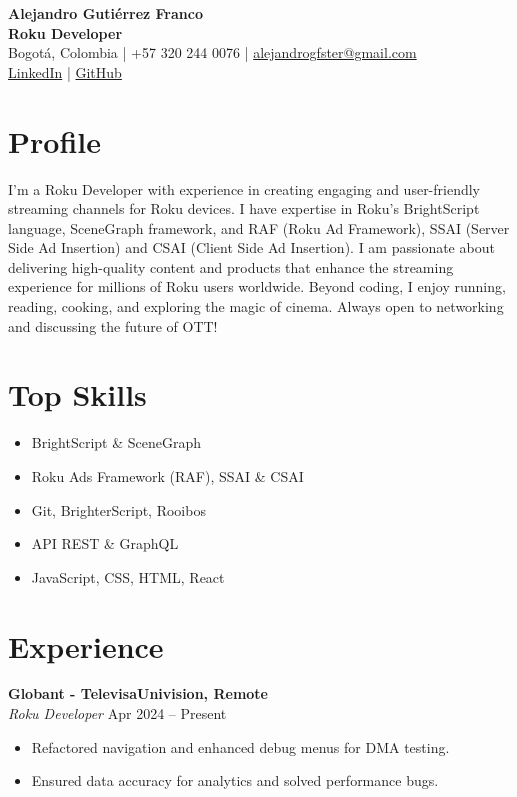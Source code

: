 \documentclass[11pt,a4paper]{article}
\begin{document}
\raggedright
\sloppy

\begin{center}
    {\LARGE \textbf{Alejandro Gutiérrez Franco}}\\
    \textbf{Roku Developer} \\
    Bogotá, Colombia | +57 320 244 0076 | \href{mailto:alejandrogfster@gmail.com}{alejandrogfster@gmail.com} \\
    \href{https://www.linkedin.com/in/alejandro-gutierrez-franco-06214674}{LinkedIn} |
    \href{https://github.com/fragualej/creative-coding}{GitHub}
\end{center}

\section*{Profile}
I'm a Roku Developer with experience in creating engaging and user-friendly streaming channels for Roku devices. I have expertise in Roku's BrightScript language, SceneGraph framework, and RAF (Roku Ad Framework), SSAI (Server Side Ad Insertion) and CSAI (Client Side Ad Insertion). I am passionate about delivering high-quality content and products that enhance the streaming experience for millions of Roku users worldwide. Beyond coding, I enjoy running, reading, cooking, and exploring the magic of cinema. Always open to networking and discussing the future of OTT!

\section*{Top Skills}
\begin{multicols}{2}
\begin{itemize}
    \item BrightScript \& SceneGraph
    \item Roku Ads Framework (RAF), SSAI \& CSAI
    \item Git, BrighterScript, Rooibos
    \item API REST \& GraphQL
    \item JavaScript, CSS, HTML, React
\end{itemize}
\end{multicols}

\section*{Experience}

\textbf{Globant - TelevisaUnivision, Remote} \\
\emph{Roku Developer} \hfill Apr 2024 -- Present \\
\begin{itemize}[leftmargin=*]
    \item Refactored navigation and enhanced debug menus for DMA testing.
    \item Ensured data accuracy for analytics and solved performance bugs.
\end{itemize}
\end{document}
